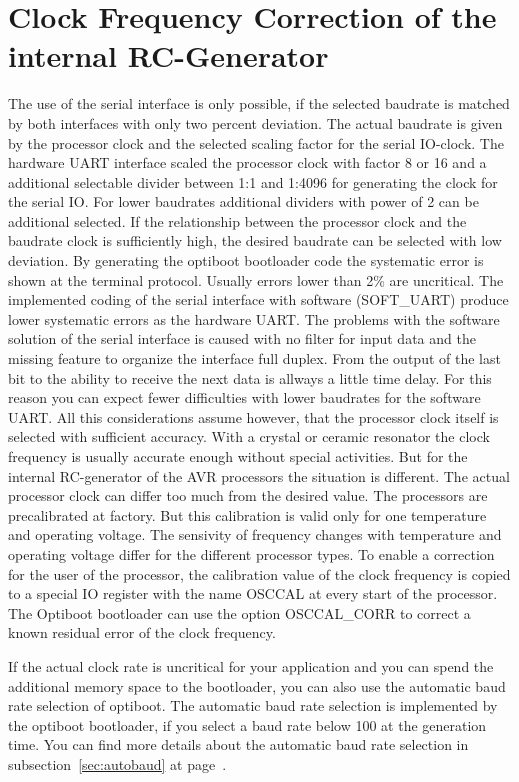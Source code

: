 \section{Clock Frequency Correction of the internal RC-Generator}

The use of the serial interface is only possible, if the selected baudrate is
matched by both interfaces with only two percent deviation.
The actual baudrate is given by the processor clock and the selected scaling factor for
the serial IO-clock. 
The hardware UART interface scaled the processor clock with factor 8 or 16 and a
additional selectable divider between 1:1 and 1:4096 for generating the clock
for the serial IO.
For lower baudrates additional dividers with power of 2 can be additional selected.
If the relationship between the processor clock and the baudrate clock is
sufficiently high, the desired baudrate can be selected with low deviation.
By generating the optiboot bootloader code the systematic error is shown
at the terminal protocol.
Usually errors lower than 2\% are uncritical.
The implemented coding of the serial interface with software (SOFT\_UART) produce
lower systematic errors as the hardware UART.
The problems with the software solution of the serial interface is caused with
no filter for input data and the missing feature to organize the interface
full duplex. From the output of the last bit to the ability to receive
the next data is allways a little time delay.
For this reason you can expect fewer difficulties with lower baudrates for
the software UART.
All this considerations assume however, that the processor clock itself is
selected with sufficient accuracy.
With a crystal or ceramic resonator the clock frequency is usually accurate enough
without special activities. But for the internal RC-generator of the AVR processors
the situation is different.
The actual processor clock can differ too much from the desired value.
The processors are precalibrated at factory. But this calibration is
valid only for one temperature and operating voltage.
The sensivity of frequency changes with temperature and operating voltage
differ for the different processor types.
To enable a correction for the user of the processor, the calibration value
of the clock frequency is copied to a special IO register with the name OSCCAL
at every start of the processor.
The Optiboot bootloader can use the option OSCCAL\_CORR to correct a
known residual error of the clock frequency.

If the actual clock rate is uncritical for your application and you
can spend the additional memory space to the bootloader,
you can also use the automatic baud rate selection of optiboot.
The automatic baud rate selection is implemented by the optiboot bootloader,
if you select a baud rate below 100 at the generation time.
You can find more details about the automatic baud rate selection in
subsection~\ref{sec:autobaud} at page~\pageref{sec:autobaud}.

